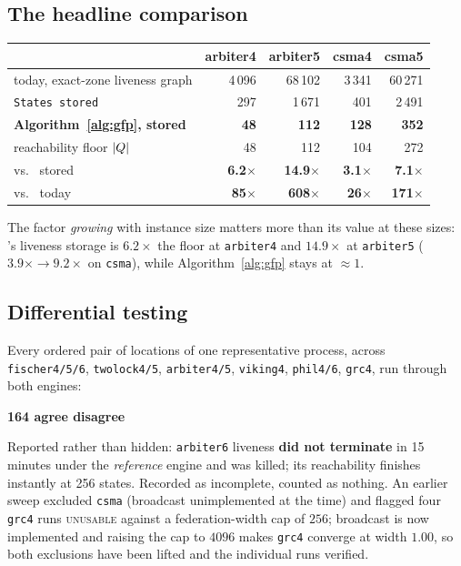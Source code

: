 \subsection{The headline comparison}

\begin{center}\small
\begin{tabular}{lrrrr}
\toprule
 & arbiter4 & arbiter5 & csma4 & csma5 \\
\midrule
\tool{} today, exact-zone liveness graph & 4\,096 & 68\,102 & 3\,341 & 60\,271 \\
\uppaal{} \texttt{States stored}          & 297    & 1\,671  & 401    & 2\,491 \\
\textbf{Algorithm~\ref{alg:gfp}, stored}  & \textbf{48} & \textbf{112} & \textbf{128} & \textbf{352} \\
reachability floor $|Q|$              & 48     & 112     & 104    & 272 \\
\midrule
vs.\ \uppaal{} stored & \textbf{6.2$\times$} & \textbf{14.9$\times$} & \textbf{3.1$\times$} & \textbf{7.1$\times$} \\
vs.\ \tool{} today    & \textbf{85$\times$}  & \textbf{608$\times$}  & \textbf{26$\times$}  & \textbf{171$\times$} \\
\bottomrule
\end{tabular}
\end{center}
\measured{}

The factor \emph{growing} with instance size matters more than its value at these sizes:
\uppaal{}'s liveness storage is $6.2\times$ the floor at \texttt{arbiter4} and $14.9\times$ at
\texttt{arbiter5} ($3.9\times \to 9.2\times$ on \texttt{csma}), while Algorithm~\ref{alg:gfp} stays
at $\approx 1$.

\subsection{Differential testing}

Every ordered pair of locations of one representative process, across
\texttt{fischer4/5/6}, \texttt{twolock4/5}, \texttt{arbiter4/5}, \texttt{viking4},
\texttt{phil4/6}, \texttt{grc4}, run through both engines:

\begin{center}
\textbf{164 agree  disagree}
\end{center}
\measured{}

Reported rather than hidden: \texttt{arbiter6} liveness \textbf{did not terminate} in 15 minutes
under the \emph{reference} engine and was killed; its reachability finishes instantly at 256 states.
Recorded as incomplete, counted as nothing. An earlier sweep excluded \texttt{csma} (broadcast
unimplemented at the time) and flagged four \texttt{grc4} runs \textsc{unusable} against a
federation-width cap of $256$; broadcast is now implemented and raising the cap to $4096$ makes
\texttt{grc4} converge at width $1.00$, so both exclusions have been lifted and the individual runs
verified.

